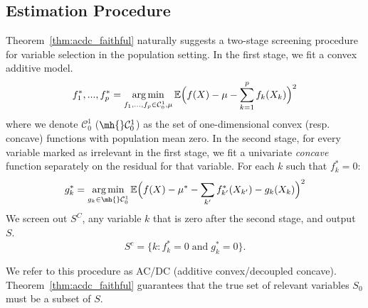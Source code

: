 \def\C{\mathcal{C}}

\subsection{Estimation Procedure}
\label{sec:acdc}

Theorem~\ref{thm:acdc_faithful} naturally suggests 
a two-stage screening procedure for variable selection in the population setting. In the first stage, we fit a convex additive model. 
\begin{equation}
\label{eqn:scam2_pop}
f^*_1, ..., f^*_p = \argmin_{f_1,...,f_p \in \C^1_0, \mu} 
   \E \Big( f(X) - \mu - \sum_{k=1}^p f_k(X_k) \Big)^2 
\end{equation}
where we denote $\C^1_0$ ($\mh{}\C^1_0$) as the set of one-dimensional convex (resp. concave) functions with population mean zero. In the second stage, for every variable marked as irrelevant in the first stage, we fit a univariate \emph{concave} function separately on the residual for that variable.
 For each $k$ such that $ f^*_k = 0$:
\begin{equation}
\label{eqn:dc2}
g^*_k = \argmin_{g_k \in \mh{}\C^1_0} 
   \E \Big( f(X) - \mu^* - \sum_{k'} f^*_{k'}(X_{k'}) 
    - g_k(X_{k})\Big)^2 
\end{equation}
We screen out $S^C$, any variable $k$ that is zero after the second stage, and output $S$.
\begin{equation}
\label{eqn:acdc_vars_pop}
S^c = \bigl\{k : f^*_k =
0 \; \mathrm{and}\; g^*_k =0\bigr\}.
\end{equation}

We refer to this procedure as AC/DC (additive
convex/decoupled concave). Theorem~\ref{thm:acdc_faithful} guarantees that the true set of relevant variables $S_0$ must be a subset of $S$.


